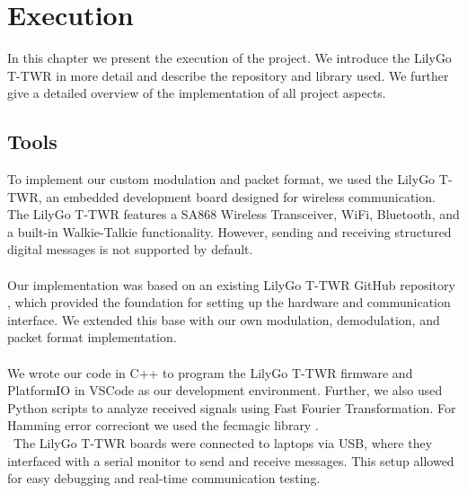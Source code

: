 \chapter{Execution}
In this chapter we present the execution of the project. We introduce the LilyGo T-TWR in more detail and describe the repository and library used. We further give a detailed overview of the implementation of all project aspects.
\section{Tools}
To implement our custom modulation and packet format, we used the LilyGo T-TWR, an embedded development board designed for wireless communication. The LilyGo T-TWR features a SA868 Wireless Transceiver, WiFi, Bluetooth, and a built-in Walkie-Talkie functionality. However, sending and receiving structured digital messages is not supported by default.
\\ \\
Our implementation was based on an existing LilyGo T-TWR GitHub repository \cite{lilygo2024}, which provided the foundation for setting up the hardware and communication interface. We extended this base with our own modulation, demodulation, and packet format implementation.
\\ \\
We wrote our code in C++ to program the LilyGo T-TWR firmware and PlatformIO in VSCode as our development environment. Further, we also used Python scripts to analyze received signals using Fast Fourier Transformation. For Hamming error correciont we used the fecmagic library \cite{kristof2020}.
\\ \ 
The LilyGo T-TWR boards were connected to laptops via USB, where they interfaced with a serial monitor to send and receive messages. This setup allowed for easy debugging and real-time communication testing.

